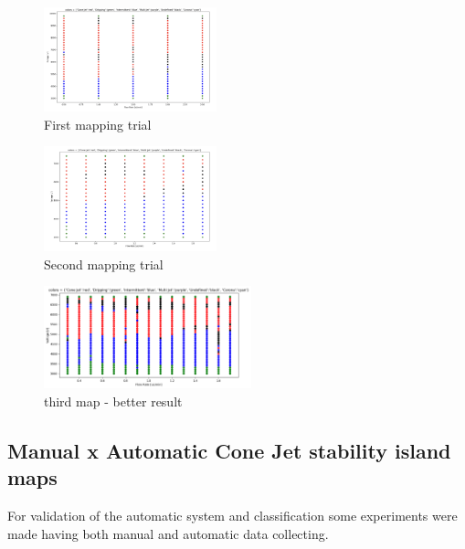         \begin{multicols}{3}


            \begin{figure}[H]
                \center
                \includegraphics[width=5cm]{Figuras/report3/map1.png}
                \caption{First mapping trial}
            \end{figure}

            \begin{figure}[H]
                \center
                \includegraphics[width=5cm]{Figuras/report3/map2.png}
                \caption{Second mapping trial}
            \end{figure}


            \begin{figure}[H]
                \center
                \includegraphics[width=6cm]{Figuras/report3/map3.png}
                \caption{third map - better result}
            \end{figure}

        \end{multicols}



    \subsection{Manual x Automatic Cone Jet stability island maps}

        For validation of the automatic system and classification some experiments were made having both manual and automatic data collecting.

